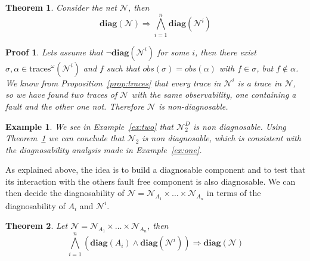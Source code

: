 \documentclass[a4paper]{article}
\newcommand{\diag}[1]{\textbf{diag}(#1)}
\newcommand{\imp}{\Rightarrow}
\newcommand{\obs}[1]{obs(#1)}
\newcommand\netn{{\mathcal{N}}}
\newtheorem{exmp}{Example}
\newtheorem{thm}{Theorem}
\newtheorem{pf}{Proof}
\newcommand{\inftraces}[1]{\mathrm{traces}^{\omega}(#1)}
\begin{document}
\begin{thm}
  Consider the net $\netn$, then $$\diag \netn \imp \bigwedge\limits_{i=1}^n\diag{\netn^i}$$
  \label{the:one}
\end{thm}

\begin{pf}
  Lets assume that $\neg \diag{\netn^i}$ for some $i$, then there exist $\sigma, \alpha \in \inftraces{\netn^i}$ and $f$ such that $\obs \sigma = \obs \alpha$ with $f \in \sigma$, but $f \not \in \alpha$. We know from Proposition~\ref{prop:traces} that every trace in $\netn^i$ is a trace in $\netn$, so we have found two traces of $\netn$ with the same observability, one containing a fault and the other one not. Therefore $\netn$ is non-diagnosable.
\end{pf}

\begin{exmp}
  We see in Example~\ref{ex:two} that $\netn_2^D$ is non diagnosable. Using Theorem~\ref{the:one} we can conclude that $\netn_2$ is non diagnosable, which is consistent with the diagnosability analysis made in Example~\ref{ex:one}.
\end{exmp}

As explained above, the idea is to build a diagnosable component and to test that its interaction with the others fault free component is also diagnosable. We can then decide the diagnosability of $\netn = \netn_{A_1} \times \dots \times \netn_{A_n}$ in terms of the diagnosability of $A_i$ and $\netn^i$.

\begin{thm}
  Let $\netn = \netn_{A_1} \times \dots \times \netn_{A_n}$, then $$\bigwedge\limits_{i=1}^n (\diag{A_i} \land \diag{\netn^i}) \imp \diag \netn$$
\end{thm}
\end{document}
